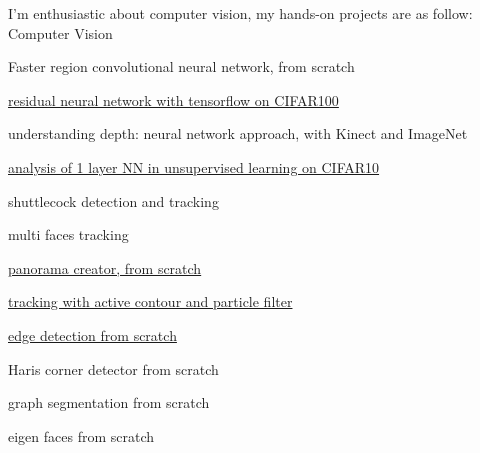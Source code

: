 

\begin{cventries}

  \cventry
    {I'm enthusiastic about computer vision, my hands-on projects are as follow:} %
    {Computer Vision} %
    { } %
    { } %
    {
      \begin{cvitems} %
        \item {Faster region convolutional neural network, from scratch}
        \item {\href{https://github.com/yihui-he/Residual-neural-network}{residual neural network with tensorflow on CIFAR100}}
        \item {understanding depth: neural network approach, with Kinect and ImageNet}
        \item {\href{https://github.com/yihui-he/Single-Layer-neural-network-with-PCAwhitening-Kmeans}
        {analysis of 1 layer NN in unsupervised learning on CIFAR10}}
        \item {shuttlecock detection and tracking}
        \item {multi faces tracking}
        \item {\href{https://github.com/yihui-he/panorama}{panorama creator, from scratch}}
        \item {\href{https://github.com/yihui-he/lip-tracking-with-snake-active-contour-and-particle-filter}
        {tracking with active contour and particle filter}}
        \item {\href{https://github.com/yihui-he/Edge-detection-with-zero-crossing}{edge detection from scratch}}
        \item {Haris corner detector from scratch}
        \item {graph segmentation from scratch}
        \item {eigen faces from scratch}
      \end{cvitems}
    }



\end{cventries}
